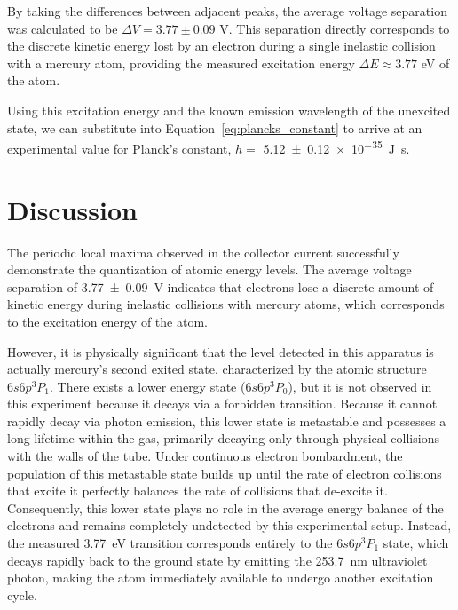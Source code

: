 \documentclass[11pt]{article}
\begin{document}
    By taking the differences between adjacent peaks, the average voltage
    separation was calculated to be \( \Delta V  = 3.77 \pm 0.09\) \si{\volt}.
    This separation directly corresponds to the discrete kinetic energy lost
    by an electron during a single inelastic collision with a mercury atom,
    providing the measured excitation energy \( \Delta E \approx 3.77 \)
    \si{\electronvolt} of the atom.

    Using this excitation energy and the known emission wavelength of the
    unexcited state, we can substitute into Equation~\ref{eq:plancks_constant}
    to arrive at an experimental value for Planck's constant,
    \( h = \) \SI{5.12 \pm 0.12 e-35}{\joule\second}.

    \section{Discussion}\label{sec:discussion}

    The periodic local maxima observed in the collector current successfully
    demonstrate the quantization of atomic energy levels.
    The average voltage separation of \SI{3.77 \pm 0.09}{\volt} indicates that
    electrons lose a discrete amount of kinetic energy during inelastic
    collisions with mercury atoms, which corresponds to the excitation energy of
    the atom.

    However, it is physically significant that the level detected in this
    apparatus is actually mercury's second exited state, characterized by the
    atomic structure \( 6s6p^3 P_1 \).
    There exists a lower energy state (\( 6s6p^3 P_0 \)), but it is not
    observed in this experiment because it decays via a forbidden transition.
    Because it cannot rapidly decay via photon emission, this lower state is
    metastable and possesses a long lifetime within the gas, primarily
    decaying only through physical collisions with the walls of the tube.
    Under continuous electron bombardment, the population of this metastable
    state builds up until the rate of electron collisions that excite it
    perfectly balances the rate of collisions that de-excite it.
    Consequently, this lower state plays no role in the average energy balance
    of the electrons and remains completely undetected by this experimental
    setup.
    Instead, the measured \SI{3.77}{\electronvolt} transition corresponds
    entirely to the \( 6s6p^3 P_1 \) state, which decays rapidly back to the
    ground state by emitting the \SI{253.7}{\nano\meter} ultraviolet photon,
    making the atom immediately available to undergo another excitation cycle.
\end{document}
